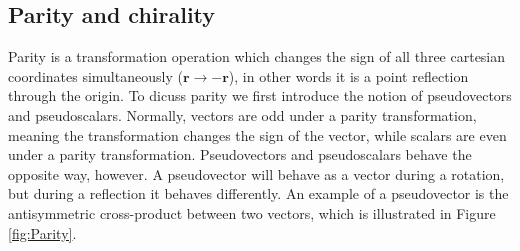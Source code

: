 \subsection{Parity and chirality} \label{sec:Parity}
Parity is a transformation operation which changes the sign of all three cartesian coordinates simultaneously ($\mathbold{r}\rightarrow-\mathbold{r}$), in other words it is a point reflection through the origin. 
To dicuss parity we first introduce the notion of pseudovectors and pseudoscalars. Normally, vectors are odd under a parity transformation, meaning the transformation changes the sign of the vector, while scalars are even under a parity transformation. Pseudovectors and pseudoscalars behave the opposite way, however. A pseudovector will behave as a vector during a rotation, but during a reflection it behaves differently. An example of a pseudovector is the antisymmetric cross-product between two vectors, which is illustrated in Figure \ref{fig:Parity}. 
